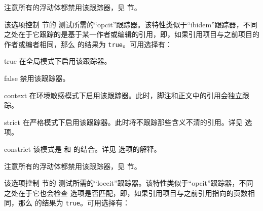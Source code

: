 \begin{optionlist}
注意所有的浮动体都禁用该跟踪器，见  节。


该选项控制  节的  测试所需的“opcit”跟踪器。该特性类似于“ibidem”跟踪器，不同之处在于它跟踪的是基于某一作者或编辑的引用，即，如果引用项目与之前项目的作者或编者相同，那么  的结果为 \texttt{true}。可用选择有：

\begin{valuelist}
\item[true] %
在全局模式下启用该跟踪器。
\item[false] %
禁用该跟踪器。
\item[context] %
在环境敏感模式下启用该跟踪器。此时，脚注和正文中的引用会独立跟踪。
\item[strict] %
在严格模式下启用该跟踪器。此时将不跟踪那些含义不清的引用。详见  选项。
\item[constrict] %
该模式是  和  的结合。详见   选项的解释。
\end{valuelist}

注意所有的浮动体都禁用该跟踪器，见  节。


该选项控制  节的  测试所需的“loccit”跟踪器。该特性类似于“opcit”跟踪器，不同之处在于它也会检查  选项是否匹配，即，如果引用项目与之前引用指向的页数相同，那么  的结果为 \texttt{true}。可用选择有：


\end{optionlist}
